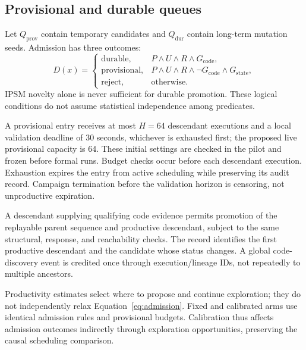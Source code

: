 \documentclass[final,5p,times,number]{elsarticle}
\newcommand{\gcode}{G_{\mathrm{code}}}
\newcommand{\gstate}{G_{\mathrm{state}}}
\begin{document}
\subsection{Provisional and durable queues}
Let $Q_{\mathrm{prov}}$ contain temporary candidates and $Q_{\mathrm{dur}}$ contain long-term mutation seeds. Admission has three outcomes:
\begin{equation}
D(x)=
\begin{cases}
\mathrm{durable}, & P\land U\land R\land\gcode,\\
\mathrm{provisional}, & P\land U\land R\land\neg\gcode\land\gstate,\\
\mathrm{reject}, & \text{otherwise}.
\end{cases}\label{eq:admission}
\end{equation}
IPSM novelty alone is never sufficient for durable promotion. These logical conditions do not assume statistical independence among predicates.

A provisional entry receives at most $H=64$ descendant executions and a local validation deadline of 30 seconds, whichever is exhausted first; the proposed live provisional capacity is 64. These initial settings are checked in the pilot and frozen before formal runs. Budget checks occur before each descendant execution. Exhaustion expires the entry from active scheduling while preserving its audit record. Campaign termination before the validation horizon is censoring, not unproductive expiration.

A descendant supplying qualifying code evidence permits promotion of the replayable parent sequence and productive descendant, subject to the same structural, response, and reachability checks. The record identifies the first productive descendant and the candidate whose status changes. A global code-discovery event is credited once through execution/lineage IDs, not repeatedly to multiple ancestors.

Productivity estimates select where to propose and continue exploration; they do not independently relax Equation~\ref{eq:admission}. Fixed and calibrated arms use identical admission rules and provisional budgets. Calibration thus affects admission outcomes indirectly through exploration opportunities, preserving the causal scheduling comparison.
\end{document}
